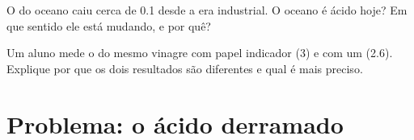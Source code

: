 \begin{exercise}[$\star\star\star$]\label{exo:g9:acids-bases-ph:11}
O  do oceano caiu cerca de 0.1 desde a era industrial. O oceano é
ácido hoje? Em que sentido ele está mudando, e por quê?
\end{exercise}

\begin{exercise}[$\star\star\star$]\label{exo:g9:acids-bases-ph:12}
Um aluno mede o  do mesmo vinagre com papel indicador (3) e com um
 (2.6). Explique por que os dois resultados são diferentes e
qual é mais preciso.
\end{exercise}

\section{Problema: o ácido derramado}

